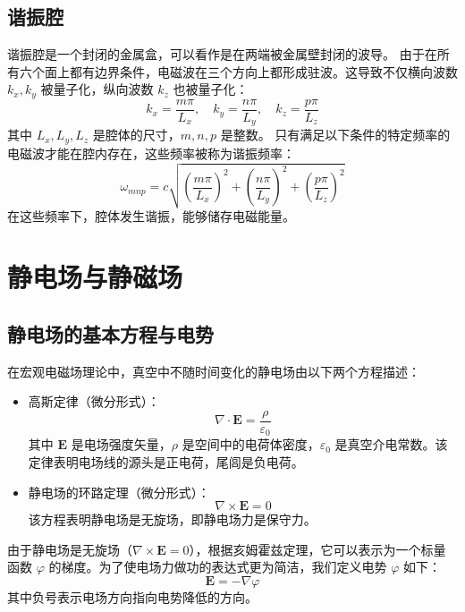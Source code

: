 \documentclass[fontset=none]{ctexart}
\begin{document}
\subsection{谐振腔}
谐振腔是一个封闭的金属盒，可以看作是在两端被金属壁封闭的波导。
由于在所有六个面上都有边界条件，电磁波在三个方向上都形成驻波。这导致不仅横向波数 $k_x, k_y$ 被量子化，纵向波数 $k_z$ 也被量子化：
\begin{equation}
k_x = \frac{m\pi}{L_x}, \quad k_y = \frac{n\pi}{L_y}, \quad k_z = \frac{p\pi}{L_z}
\end{equation}
其中 $L_x, L_y, L_z$ 是腔体的尺寸，$m,n,p$ 是整数。
只有满足以下条件的特定频率的电磁波才能在腔内存在，这些频率被称为谐振频率：
\begin{equation}
\omega_{mnp} = c\sqrt{\left(\frac{m\pi}{L_x}\right)^2 + \left(\frac{n\pi}{L_y}\right)^2 + \left(\frac{p\pi}{L_z}\right)^2}
\end{equation}
在这些频率下，腔体发生谐振，能够储存电磁能量。

\section{静电场与静磁场}

\subsection{静电场的基本方程与电势}

\begin{definition}[静电场基本方程]
在宏观电磁场理论中，真空中不随时间变化的静电场由以下两个方程描述：
\begin{itemize}
    \item 高斯定律（微分形式）：
    \begin{equation}
        \nabla \cdot \bm{E} = \frac{\rho}{\varepsilon_0}
    \end{equation}
    其中 $\bm{E}$ 是电场强度矢量，$\rho$ 是空间中的电荷体密度，$\varepsilon_0$ 是真空介电常数。该定律表明电场线的源头是正电荷，尾闾是负电荷。
    \item 静电场的环路定理（微分形式）：
    \begin{equation}
        \nabla \times \bm{E} = 0
    \end{equation}
    该方程表明静电场是无旋场，即静电场力是保守力。
\end{itemize}
\end{definition}

\begin{definition}[电势]
由于静电场是无旋场（$\nabla \times \bm{E} = 0$），根据亥姆霍兹定理，它可以表示为一个标量函数 $\varphi$ 的梯度。为了使电场力做功的表达式更为简洁，我们定义电势 $\varphi$ 如下：
\begin{equation}
    \bm{E} = -\nabla \varphi
\end{equation}
其中负号表示电场方向指向电势降低的方向。
\end{definition}
\end{document}
